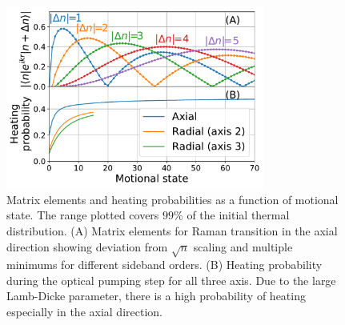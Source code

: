 \documentclass[aps,prl,twocolumn,groupedaddress]{revtex4-1}
\begin{document}
\begin{figure}[b]
  \includegraphics[width=8.5cm]{imgs/fig2_raman_op.pdf}
  \caption{Matrix elements and heating probabilities as a function of motional state.
    The range plotted covers $99\%$ of the initial thermal distribution.
    (A) Matrix elements for Raman transition in the axial direction showing deviation from
    $\sqrt{n}$ scaling and multiple minimums for different sideband orders.
    (B) Heating probability during the optical pumping step for all three axis.
    Due to the large Lamb-Dicke parameter,
    there is a high probability of heating especially in the axial direction.
    \label{f-ld}}
\end{figure}
\end{document}
